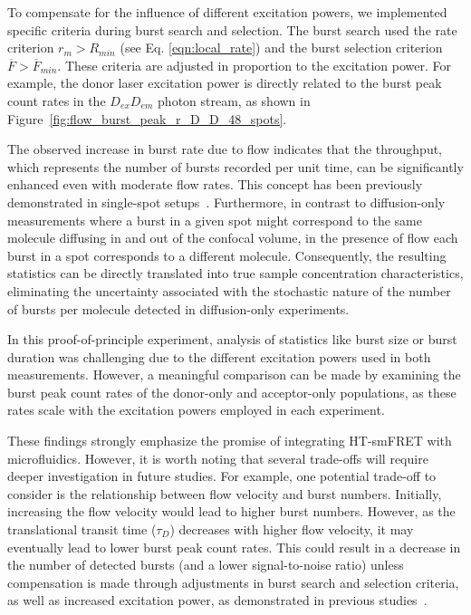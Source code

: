 To compensate for the influence of different excitation powers, we implemented specific criteria during burst search and selection. 
The burst search used the rate criterion $r_m > R_{min}$ (see Eq. \ref{eqn:local_rate}) and the burst selection criterion $\overline{F} > \overline{F}_{min}$.
These criteria are adjusted in proportion to the excitation power. 
For example, the donor laser excitation power is directly related to the burst peak count rates in the $D_{ex}D_{em}$ photon stream, as shown in Figure~\ref{fig:flow_burst_peak_r_D_D_48_spots}.

The observed increase in burst rate due to flow indicates that the throughput, which represents the number of bursts recorded per unit time, can be significantly enhanced even with moderate flow rates. 
This concept has been previously demonstrated in single-spot setups~\cite{horrocks_AC_2012}.
Furthermore, in contrast to diffusion-only measurements where a burst in a given spot might correspond to the same molecule diffusing in and out of the confocal volume, in the presence of flow each burst in a spot corresponds to a different molecule. 
Consequently, the resulting statistics can be directly translated into true sample concentration characteristics, eliminating the uncertainty associated with the stochastic nature of the number of bursts per molecule detected in diffusion-only experiments.

In this proof-of-principle experiment, analysis of statistics like burst size or burst duration was challenging due to the different excitation powers used in both measurements. 
However, a meaningful comparison can be made by examining the burst peak count rates of the donor-only and acceptor-only populations, as these rates scale with the excitation powers employed in each experiment.

These findings strongly emphasize the promise of integrating \ac{HT-smFRET} with microfluidics. 
However, it is worth noting that several trade-offs will require deeper investigation in future studies.
For example, one potential trade-off to consider is the relationship between flow velocity and burst numbers. 
Initially, increasing the flow velocity would lead to higher burst numbers. 
However, as the translational transit time ($\tau_D$) decreases with higher flow velocity, it may eventually lead to lower burst peak count rates. 
This could result in a decrease in the number of detected bursts (and a lower signal-to-noise ratio) unless compensation is made through adjustments in burst search and selection criteria, as well as increased excitation power, as demonstrated in previous studies~\cite{horrocks_AC_2012}.


